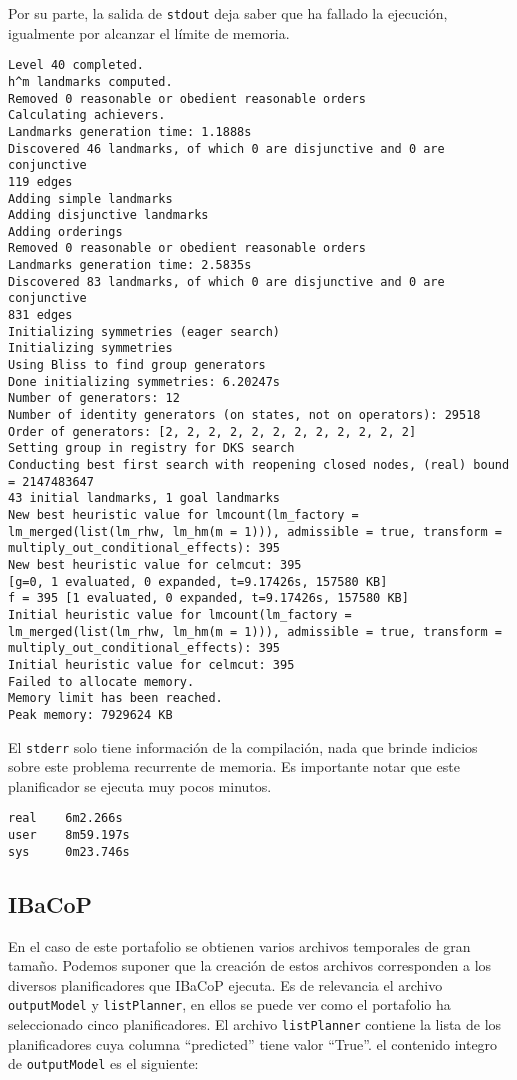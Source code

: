\documentclass[a4paper,12pt,twocolumn]{article}
\begin{document}
Por su parte, la salida de \texttt{stdout} deja saber que ha fallado la ejecución, igualmente por alcanzar el límite de memoria.
\begin{lstlisting}[style=consola]
Level 40 completed.
h^m landmarks computed.
Removed 0 reasonable or obedient reasonable orders
Calculating achievers.
Landmarks generation time: 1.1888s
Discovered 46 landmarks, of which 0 are disjunctive and 0 are conjunctive 
119 edges
Adding simple landmarks
Adding disjunctive landmarks
Adding orderings
Removed 0 reasonable or obedient reasonable orders
Landmarks generation time: 2.5835s
Discovered 83 landmarks, of which 0 are disjunctive and 0 are conjunctive 
831 edges
Initializing symmetries (eager search)
Initializing symmetries
Using Bliss to find group generators
Done initializing symmetries: 6.20247s
Number of generators: 12
Number of identity generators (on states, not on operators): 29518
Order of generators: [2, 2, 2, 2, 2, 2, 2, 2, 2, 2, 2, 2]
Setting group in registry for DKS search
Conducting best first search with reopening closed nodes, (real) bound = 2147483647
43 initial landmarks, 1 goal landmarks
New best heuristic value for lmcount(lm_factory = lm_merged(list(lm_rhw, lm_hm(m = 1))), admissible = true, transform = multiply_out_conditional_effects): 395
New best heuristic value for celmcut: 395
[g=0, 1 evaluated, 0 expanded, t=9.17426s, 157580 KB]
f = 395 [1 evaluated, 0 expanded, t=9.17426s, 157580 KB]
Initial heuristic value for lmcount(lm_factory = lm_merged(list(lm_rhw, lm_hm(m = 1))), admissible = true, transform = multiply_out_conditional_effects): 395
Initial heuristic value for celmcut: 395
Failed to allocate memory.
Memory limit has been reached.
Peak memory: 7929624 KB
\end{lstlisting}

El \texttt{stderr} solo tiene información de la compilación, nada que brinde indicios sobre este problema recurrente de memoria. Es importante notar que este planificador se ejecuta muy pocos minutos.

\begin{lstlisting}[style=consola]
real    6m2.266s
user    8m59.197s
sys     0m23.746s
\end{lstlisting}

\subsection{IBaCoP}

En el caso de este portafolio se obtienen varios archivos temporales de gran tamaño. Podemos suponer que la creación de estos archivos corresponden a los diversos planificadores que IBaCoP ejecuta. Es de relevancia el archivo \texttt{outputModel} y \texttt{listPlanner}, en ellos se puede ver como el portafolio ha seleccionado cinco planificadores. El archivo \texttt{listPlanner} contiene la lista de los planificadores cuya columna ``predicted'' tiene valor ``True''. el contenido integro de \texttt{outputModel} es el siguiente:
\end{document}
